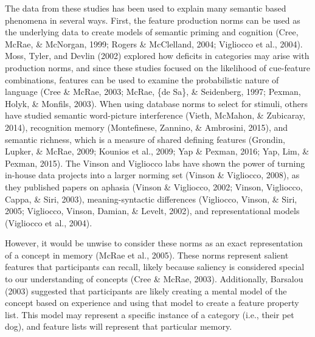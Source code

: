 \documentclass[english,man]{apa6}
\theoremstyle{definition}
\theoremstyle{definition}
\theoremstyle{definition}
\theoremstyle{remark}
\begin{document}
The data from these studies has been used to explain many semantic based
phenomena in several ways. First, the feature production norms can be
used as the underlying data to create models of semantic priming and
cognition (Cree, McRae, \& McNorgan, 1999; Rogers \& McClelland, 2004;
Vigliocco et al., 2004). Moss, Tyler, and Devlin (2002) explored how
deficits in categories may arise with production norms, and since these
studies focused on the likelihood of cue-feature combinations, features
can be used to examine the probabilistic nature of language (Cree \&
McRae, 2003; McRae, \{de Sa\}, \& Seidenberg, 1997; Pexman, Holyk, \&
Monfils, 2003). When using database norms to select for stimuli, others
have studied semantic word-picture interference (Vieth, McMahon, \&
Zubicaray, 2014), recognition memory (Montefinese, Zannino, \&
Ambrosini, 2015), and semantic richness, which is a measure of shared
defining features (Grondin, Lupker, \& McRae, 2009; Kounios et al.,
2009; Yap \& Pexman, 2016; Yap, Lim, \& Pexman, 2015). The Vinson and
Vigliocco labs have shown the power of turning in-house data projects
into a larger norming set (Vinson \& Vigliocco, 2008), as they published
papers on aphasia (Vinson \& Vigliocco, 2002; Vinson, Vigliocco, Cappa,
\& Siri, 2003), meaning-syntactic differences (Vigliocco, Vinson, \&
Siri, 2005; Vigliocco, Vinson, Damian, \& Levelt, 2002), and
representational models (Vigliocco et al., 2004).

However, it would be unwise to consider these norms as an exact
representation of a concept in memory (McRae et al., 2005). These norms
represent salient features that participants can recall, likely because
saliency is considered special to our understanding of concepts (Cree \&
McRae, 2003). Additionally, Barsalou (2003) suggested that participants
are likely creating a mental model of the concept based on experience
and using that model to create a feature property list. This model may
represent a specific instance of a category (i.e., their pet dog), and
feature lists will represent that particular memory.
\end{document}
